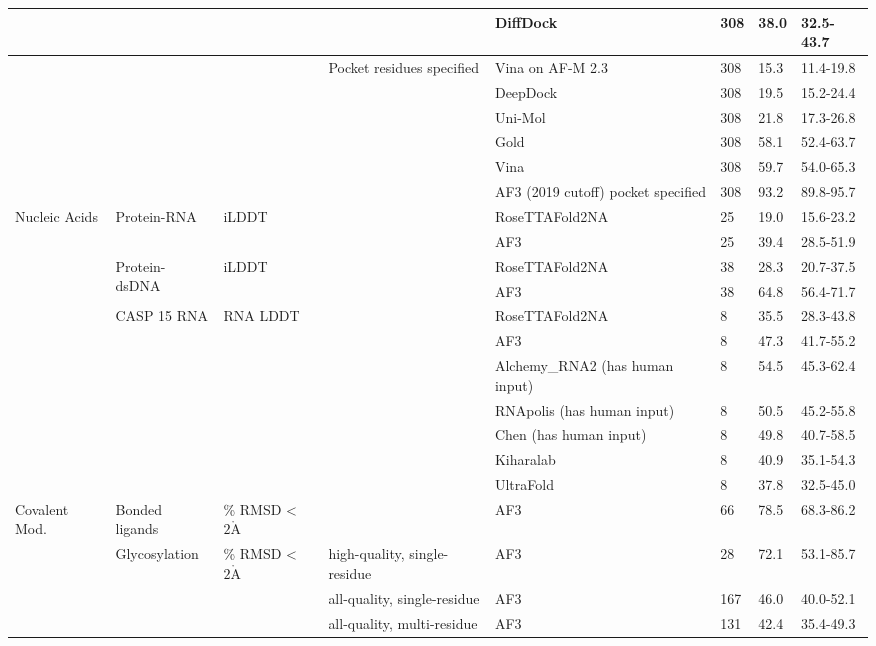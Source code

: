 \documentclass[10pt]{article}
\def\AA{\mathring{\mathrm{A}}}
\begin{document}
\begin{table}[h]
\begin{center}
\begin{tabular}{|l|l|l|l|l|l|l|l|}
\hline
 &  &  &  & DiffDock & 308 & 38.0 & 32.5-43.7 \\
\hline
 &  &  & \multirow[t]{6}{*}{Pocket residues specified} & Vina on AF-M 2.3 & 308 & 15.3 & 11.4-19.8 \\
\hline
 &  &  &  & DeepDock & 308 & 19.5 & 15.2-24.4 \\
\hline
 &  &  &  & Uni-Mol & 308 & 21.8 & 17.3-26.8 \\
\hline
 &  &  &  & Gold & 308 & 58.1 & 52.4-63.7 \\
\hline
 &  &  &  & Vina & 308 & 59.7 & 54.0-65.3 \\
\hline
 &  &  &  & AF3 (2019 cutoff) pocket specified & 308 & 93.2 & 89.8-95.7 \\
\hline
\multirow[t]{11}{*}{Nucleic Acids} & \multirow[t]{2}{*}{Protein-RNA} & \multirow[t]{2}{*}{iLDDT} &  & RoseTTAFold2NA & 25 & 19.0 & 15.6-23.2 \\
\hline
 &  &  &  & AF3 & 25 & 39.4 & 28.5-51.9 \\
\hline
 & \multirow[t]{2}{*}{Protein-dsDNA} & \multirow[t]{2}{*}{iLDDT} &  & RoseTTAFold2NA & 38 & 28.3 & 20.7-37.5 \\
\hline
 &  &  &  & AF3 & 38 & 64.8 & 56.4-71.7 \\
\hline
 & \multirow[t]{7}{*}{CASP 15 RNA} & \multirow[t]{7}{*}{RNA LDDT} &  & RoseTTAFold2NA & 8 & 35.5 & 28.3-43.8 \\
\hline
 &  &  &  & AF3 & 8 & 47.3 & 41.7-55.2 \\
\hline
 &  &  &  & Alchemy\_RNA2 (has human input) & 8 & 54.5 & 45.3-62.4 \\
\hline
 &  &  &  & RNApolis (has human input) & 8 & 50.5 & 45.2-55.8 \\
\hline
 &  &  &  & Chen (has human input) & 8 & 49.8 & 40.7-58.5 \\
\hline
 &  &  &  & Kiharalab & 8 & 40.9 & 35.1-54.3 \\
\hline
 &  &  &  & UltraFold & 8 & 37.8 & 32.5-45.0 \\
\hline
\multirow[t]{8}{*}{Covalent Mod.} & Bonded ligands & \% RMSD < $2 \AA$ &  & AF3 & 66 & 78.5 & 68.3-86.2 \\
\hline
 & \multirow[t]{3}{*}{Glycosylation} & \multirow[t]{3}{*}{\% RMSD < $2 \AA$} & high-quality, single-residue & AF3 & 28 & 72.1 & 53.1-85.7 \\
\hline
 &  &  & all-quality, single-residue & AF3 & 167 & 46.0 & 40.0-52.1 \\
\hline
 &  &  & all-quality, multi-residue & AF3 & 131 & 42.4 & 35.4-49.3 \\

\end{tabular}
\end{center}
\end{table}
\end{document}
